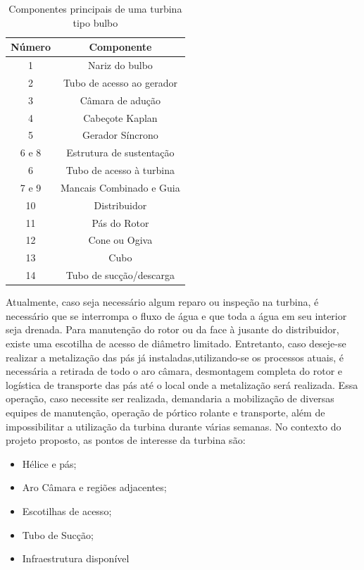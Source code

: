\begin{table}[h!]
\centering
\begin{tabular}{  c | c  }
  \hline
  \textbf{Número} & \textbf{Componente} \\ \hline
  1 & Nariz do bulbo \\ \hline
  2 & Tubo de acesso ao gerador  \\ \hline
  3 & Câmara de adução  \\ \hline
  4 & Cabeçote Kaplan  \\ \hline
  5 & Gerador Síncrono  \\ \hline
  6 e 8 & Estrutura de sustentação \\ \hline
  6 & Tubo de acesso à turbina \\ \hline
  7 e 9 & Mancais Combinado e Guia \\ \hline
  10 & Distribuidor \\ \hline
  11 & Pás do Rotor \\ \hline
  12 & Cone ou Ogiva \\ \hline
  13 & Cubo \\ \hline
  14 & Tubo de sucção/descarga \\
  \hline
\end{tabular}
\caption{Componentes principais de uma turbina tipo bulbo}
\label{tab::bulb_turbine}
\end{table}

Atualmente, caso seja necessário algum reparo ou inspeção na turbina, é necessário que se interrompa o fluxo de água e que toda a água em seu interior seja drenada. Para manutenção do rotor ou da face à jusante do distribuidor, existe uma escotilha de acesso de diâmetro limitado. Entretanto, caso deseje-se realizar a metalização das pás já instaladas,utilizando-se os processos atuais, é necessária a retirada de todo o aro câmara,
desmontagem completa do rotor e logística de transporte das pás até o local
onde a metalização será realizada. Essa operação, caso necessite ser realizada, demandaria a mobilização
de diversas equipes de manutenção, operação de pórtico rolante e transporte,
além de impossibilitar a utilização da turbina durante várias semanas.
No contexto do projeto proposto, as pontos de interesse da turbina são:

\begin{itemize}
  \item Hélice e pás;
  \item Aro Câmara e regiões adjacentes;
  \item Escotilhas de acesso;
  \item Tubo de Sucção;
  \item Infraestrutura disponível
\end{itemize} 

